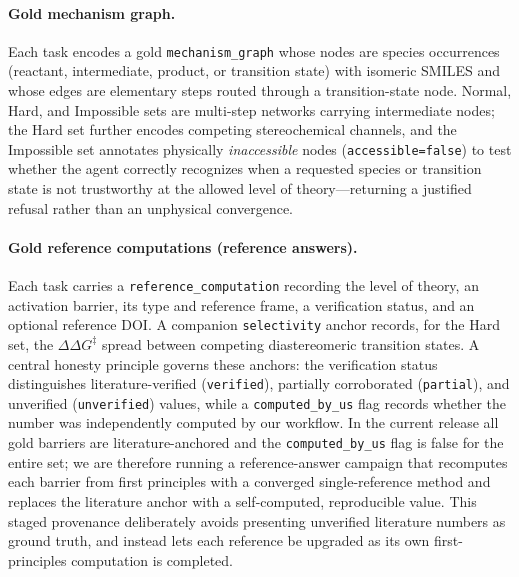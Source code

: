 \documentclass[10pt,twocolumn,letterpaper]{article}
\begin{document}
\paragraph{Gold mechanism graph.}
Each task encodes a gold \texttt{mechanism\_graph} whose nodes are species occurrences (reactant, intermediate, product, or transition state) with isomeric SMILES and whose edges are elementary steps routed through a transition-state node. Normal, Hard, and Impossible sets are multi-step networks carrying intermediate nodes; the Hard set further encodes competing stereochemical channels, and the Impossible set annotates physically \emph{inaccessible} nodes (\texttt{accessible=false}) to test whether the agent correctly recognizes when a requested species or transition state is not trustworthy at the allowed level of theory---returning a justified refusal rather than an unphysical convergence.

\paragraph{Gold reference computations (reference answers).}
Each task carries a \texttt{reference\_computation} recording the level of theory, an activation barrier, its type and reference frame, a verification status, and an optional reference DOI. A companion \texttt{selectivity} anchor records, for the Hard set, the \texttt{$\Delta\Delta G^\ddagger$} spread between competing diastereomeric transition states. A central honesty principle governs these anchors: the verification status distinguishes literature-verified (\texttt{verified}), partially corroborated (\texttt{partial}), and unverified (\texttt{unverified}) values, while a \texttt{computed\_by\_us} flag records whether the number was independently computed by our workflow. In the current release all gold barriers are literature-anchored and the \texttt{computed\_by\_us} flag is false for the entire set; we are therefore running a reference-answer campaign that recomputes each barrier from first principles with a converged single-reference method and replaces the literature anchor with a self-computed, reproducible value. This staged provenance deliberately avoids presenting unverified literature numbers as ground truth, and instead lets each reference be upgraded as its own first-principles computation is completed.
\end{document}
